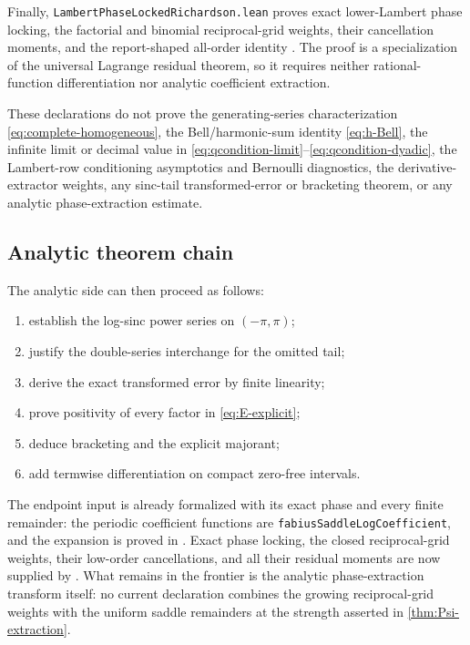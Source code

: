 \documentclass[11pt]{article}
\theoremstyle{definition}
\theoremstyle{remark}
\begin{document}
Finally, \texttt{LambertPhaseLockedRichardson.lean} proves exact lower-Lambert
phase locking, the factorial and binomial reciprocal-grid weights, their
cancellation moments, and the report-shaped all-order identity
.
The proof is a specialization of the universal Lagrange residual theorem, so
it requires neither rational-function differentiation nor analytic
coefficient extraction.

These declarations do not prove the generating-series characterization
\eqref{eq:complete-homogeneous}, the Bell/harmonic-sum identity
\eqref{eq:h-Bell}, the infinite limit or decimal value in
\eqref{eq:qcondition-limit}--\eqref{eq:qcondition-dyadic}, the Lambert-row
conditioning asymptotics and Bernoulli diagnostics, the derivative-extractor
weights, any sinc-tail transformed-error or bracketing theorem, or any
analytic phase-extraction estimate.

\subsection{Analytic theorem chain}

The analytic side can then proceed as follows:
\begin{enumerate}
\item establish the log-sinc power series on $(-\pi,\pi)$;
\item justify the double-series interchange for the omitted tail;
\item derive the exact transformed error by finite linearity;
\item prove positivity of every factor in \cref{eq:E-explicit};
\item deduce bracketing and the explicit majorant;
\item add termwise differentiation on compact zero-free intervals.
\end{enumerate}

The endpoint input is already formalized with its exact phase and every finite
remainder: the periodic coefficient functions are
\texttt{fabiusSaddleLogCoefficient}, and the expansion is proved in
.  Exact phase locking, the closed
reciprocal-grid weights, their low-order cancellations, and all their residual
moments are now supplied by
.  What remains in the frontier is the
analytic phase-extraction transform itself: no current declaration combines
the growing reciprocal-grid weights with the uniform saddle remainders at the
strength asserted in \cref{thm:Psi-extraction}.
\end{document}

